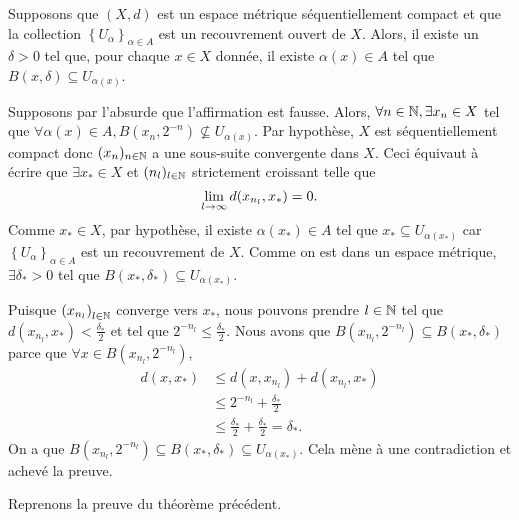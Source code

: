 \documentclass[french]{article}
\begin{document}
\begin{lemme}
  Supposons que $(X, d)$ est un espace métrique séquentiellement compact et que la collection $\left\{ U_\alpha \right\}_{\alpha \in A}$ est un recouvrement ouvert de $X$. Alors, il existe un $\delta > 0$ tel que, pour chaque  $x \in X$ donnée, il existe $\alpha(x) \in A$ tel que $B(x, \delta) \subseteq U_{\alpha(x)}$.

  \tcblower
  \begin{preuve}
    Supposons par l'absurde que l'affirmation est fausse. Alors, $\forall n \in \mathbb{N}, \exists x_n \in X$ tel que $\forall \alpha(x) \in A, B(x_n, 2^{-n}) \not \subseteq U_{\alpha(x)}$. Par hypothèse, $X$ est séquentiellement compact donc $(x_n)_{n \in \mathbb{N}}$ a une sous-suite convergente dans $X$. Ceci équivaut à écrire que  $\exists x_* \in X$ et $(n_l)_{l \in \mathbb{N}}$ strictement croissant telle que $$\lim_{l \rightarrow \infty} d(x_{n_l}, x_*) = 0.$$
    Comme $x_* \in X$, par hypothèse, il existe $\alpha(x_*) \in A$ tel que $x_* \subseteq U_{\alpha(x_*)}$ car $\left\{ U_\alpha \right\}_{\alpha \in A}$ est un recouvrement de $X$. Comme on est dans un espace métrique, $\exists \delta_* >0$ tel que $B(x_*, \delta_*) \subseteq U_{\alpha(x_*)}$.
    \par Puisque $\left( x_{n_l} \right)_{l \in \mathbb{N}}$ converge vers $x_*$, nous pouvons prendre $l \in \mathbb{N} $ tel que $d(x_{n_l}, x_*) < \frac{\delta_*}{2}$ et tel que $2^{-n_l} \leq \frac{\delta_*}{2}$. Nous avons que $B(x_{n_l}, 2^{-n_l}) \subseteq B(x_*, \delta_*)$ parce que $\forall x\in B(x_{n_l}, 2^{-n_l})$, 
    \begin{align*}
      d(x, x_*) &\leq d(x, x_{n_l}) + d(x_{n_l}, x_*) \\
                &\leq  2^{-n_l} + \frac{\delta_*}{2} \\
                &\leq  \frac{\delta_*}{2} + \frac{\delta_*}{2} = \delta_*.
    \end{align*}
    On a que $B(x_{n_l}, 2^{-n_l}) \subseteq B(x_*, \delta_*) \subseteq U_{\alpha(x_*)}$. Cela mène à une contradiction et achevé la preuve.
  \end{preuve}
\end{lemme}
Reprenons la preuve du théorème précédent.
\end{document}
